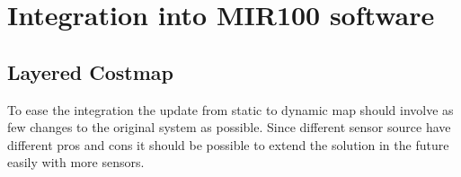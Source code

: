 \chapter{Integration into MIR100 software}

\section{Layered Costmap}
To ease the integration the update from static to dynamic map should involve as few changes to the original system as possible. 
Since different sensor source have different pros and cons it should be possible to extend the solution in the future easily with more sensors. 


